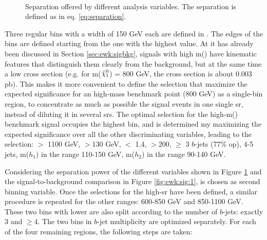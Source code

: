 \begin{figure}[htpb]
\begin{center}
\\
\caption{Separation offered by different analysis variables. The separation is defined as in eq. \ref{eq:separation}.}
\label{fig:ewk:separation}
\end{center}
\end{figure}

Three regular bins with a width of 150 GeV each are defined in \meffb. 
The edges of the bins are defined starting from the one with the highest value. 
At it has already been discussed in Section \ref{sec:ewk:sigbkg},
signals with high m(\hino) have kinematic features that distinguish them clearly from the background, 
but at the same time a low cross section (e.g. for m($\ninoone$) = 800 GeV, the cross section is about 0.003 pb). 
This makes it more convenient to define the selection that maximize the expected significance for an high-mass benchmark point (800 GeV) 
as a single-bin region, to concentrate as much as possible the signal events in one single \gls{sr}, 
instead of diluting it in several \glspl{sr}.%
The optimal selection for the high-m(\hino) benchmark signal occupies the highest \meffb bin,
and is determined my maximizing the expected significance over all the other discriminating variables,
leading to the selection:
\meffb $>$ 1100 GeV, \mtb$>$130 GeV, \dRmax $<$ 1.4, \met $>$200, $\geq$ 3 $b$-jets (77\% \gls{op}), 
4-5 jets, m($h_1$) in the range 110-150 GeV, m($h_2$) in the range 90-140 GeV.

Considering the separation power of the different variables shown in Figure  \ref{fig:ewk:separation} 
and the signal-to-background comparison in Figure \ref{fig:ewk:sig:1}, 
\dRmax is chosen as second binning variable. 
Once the selections for the high-\meffb \gls{sr} have been defined, 
a similar procedure is repeated for the other \meffb ranges: 600-850 GeV and 850-1100 GeV. 
These two bins with lower \meffb are also split according to the number of $b$-jets: exactly 3 and $\geq$4. 
The two bins in $b$-jet multiplicity are optimized separately. 
For each of the four remaining regions, the following steps are taken:

